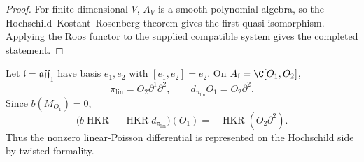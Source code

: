 \documentclass[11pt]{memoir}
\begin{document}
\begin{proof}
  For finite-dimensional \(V\), \(A_V\) is a smooth polynomial algebra,
  so the Hochschild--Kostant--Rosenberg theorem gives the first
  quasi-isomorphism.  Applying the Roos functor to the supplied
  compatible system gives the completed statement.
\end{proof}

\begin{rmk}
  Let \(\mathfrak l=\mathfrak{aff}_1\) have basis \(e_1,e_2\) with
  \([e_1,e_2]=e_2\).  On \(A_{\mathfrak l}=\C[O_1,O_2]\),
  \[
    \pi_{\mathrm{lin}}=O_2\partial^1\partial^2,
    \qquad d_{\pi_{\mathrm{lin}}}O_1=O_2\partial^2.
  \]
  Since \(b(M_{O_1})=0\),
  \[
    \bigl(b\operatorname{HKR}
      -\operatorname{HKR}d_{\pi_{\mathrm{lin}}}\bigr)(O_1)
    =-\operatorname{HKR}(O_2\partial^2).
  \]
  Thus the nonzero linear-Poisson differential is represented on the
  Hochschild side by twisted formality.
\end{rmk}
\end{document}
